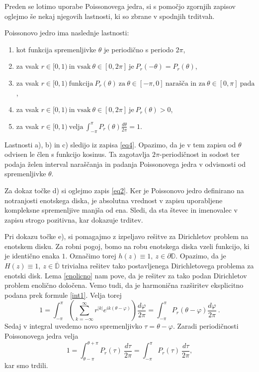 \documentclass[mat1, tisk]{fmfdelo}
\begin{document}
    Preden se lotimo uporabe Poissonovega jedra, si s pomočjo zgornjih zapisov oglejmo še nekaj njegovih lastnosti, ki so zbrane v spodnjih trditvah. 
    
    \begin{trditev}
        \label{lastpk}
        Poissonovo jedro ima naslednje lastnosti:
        \begin{enumerate}[label={\alph*)}]
            \item kot funkcija spremenljivke $\theta$ je periodično s periodo $2\pi$, 
            \item za vsak $r \in [0,1)~\text{in vsak}~\theta \in [0,2\pi]~\text{je}~P_r(-\theta) = P_r(\theta)$,
            \item za vsak $r \in [0,1)~\text{funkcija}~P_r(\theta)~\text{za}~\theta \in [-\pi, 0 ]~\text{narašča in za}~\theta \in [0, \pi ]~\text{pada}$,
            \item za vsak $r \in [0,1)~\text{in vsak}~\theta\in [0,2\pi]~\text{je}~P_r(\theta) > 0$,
            \item za vsak $r \in [0,1)~\text{velja}~\int_{-\pi}^{\pi}{P_r(\theta) \frac{d\theta}{2\pi}} = 1$.
        \end{enumerate}
    \end{trditev}
    \begin{dokaz}
        Lastnosti a), b) in c) sledijo iz zapisa \eqref{eq4}. Opazimo, da je v tem zapisu od $\theta$ odvisen le člen s funkcijo kosinus. 
        Ta zagotavlja $2\pi$-periodičnost in sodost ter podaja želen interval naraščanja in padanja Poissonovega jedra v odvisnosti od spremenljivke $\theta$. 
        
        Za dokaz točke d) si oglejmo zapis \eqref{eq2}. Ker je Poissonovo jedro definirano na notranjosti enotskega diska, je absolutna vrednost v zapisu uporabljene kompleksne spremenljive manjša od ena. 
        Sledi, da sta števec in imenovalec v zapisu strogo pozitivna, kar dokazuje trditev. 

        Pri dokazu točke e), si pomagajmo z izpeljavo rešitve za Dirichletov problem na enotskem disku. 
        Za robni pogoj, bomo na robu enotskega diska vzeli funkcijo, ki je identično enaka $1$. Označimo torej $h(z) \equiv 1,~ z \in \partial \mathbb{D}$. Opazimo, da je \mbox{$H(z) \equiv 1,~z \in \overline{\mathbb{D}}$} trivialna rešitev tako postavljenega Dirichletovega problema za enotski disk.
        Lema \ref{enolicno} nam pove, da je rešitev za tako podan Dirichletov problem enolično določena. Vemo tudi, da je harmonična razširitev eksplicitno podana prek formule \eqref{int1}.
        Velja torej
        $$
        1 = \int_{-\pi}^{\pi}{\left(\sum_{k=-\infty}^{\infty}{r^{|k|} e^{ik(\theta - \varphi)}}\right) \frac{d \varphi}{2 \pi}} = \int_{-\pi}^{\pi}{P_r(\theta - \varphi)\frac{d \varphi}{2 \pi}}~. 
        $$
        Sedaj v integral uvedemo novo spremenljivko $\tau = \theta - \varphi$. Zaradi periodičnosti Poissonovega jedra velja 
        $$
        1 = \int_{\theta - \pi}^{\theta + \pi}{P_r(\tau)~\frac{d \tau}{2 \pi}} = \int_{-\pi}^{\pi}{P_r(\tau)~\frac{d \tau}{2 \pi}},
        $$
        kar smo trdili. 
    \end{dokaz}
\end{document}
